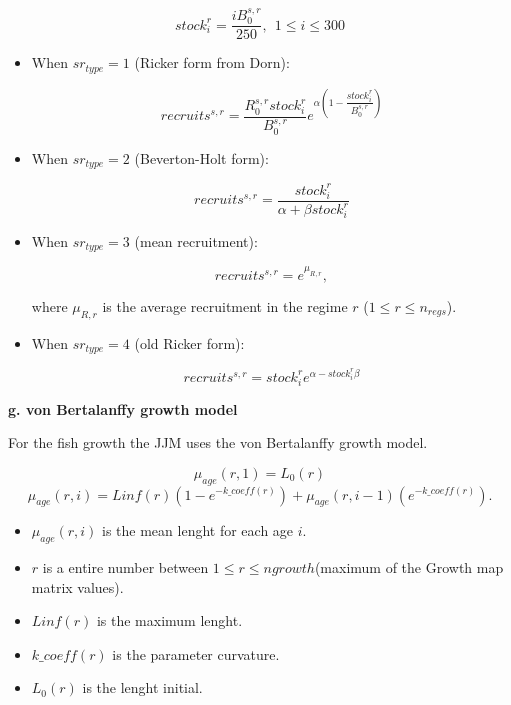 \documentclass{article}
\begin{document}
\begin{equation}
stock^r_i=\dfrac{iB^{s,r}_0}{250}, \ \ 1\leq i \leq 300
\end{equation}

\begin{itemize}

\item When $sr_{type}=1$ (Ricker form from Dorn):

    \begin{equation}
    recruits^{s,r} = \dfrac{R^{s,r}_0 stock^r_i}{B^{s,r}_0}e^{\alpha \left(1-\dfrac{stock^r_i}{B^{s,r}_0}\right)}
    \end{equation}

\item When $sr_{type}=2$ (Beverton-Holt form):

    \begin{equation}
    recruits^{s,r} = \dfrac{stock^r_i}{\alpha+\beta stock^r_i}
    \end{equation}

\item When $sr_{type}=3$ (mean recruitment):

    \begin{equation}
    recruits^{s,r} = e^{\mu_{R,r}},
    \end{equation}

    where $\mu_{R,r}$ is the average recruitment in the regime $r$ ($1\leq r \leq n_{regs}$).

\item When $sr_{type}=4$ (old Ricker form):

    \begin{equation}
    recruits^{s,r} =  stock^r_i e^{\alpha-stock^r_i \beta}
    \end{equation}

\end{itemize}


\hfill

\textbf{g. von Bertalanffy growth model}

For the fish growth the JJM uses the von Bertalanffy growth model.

\begin{equation}
    \mu_{age}(r,1)=L_0(r)
\end{equation}
\begin{equation}
    \mu_{age}(r,i)=Linf(r)(1-e^{-{k\_coeff(r)}})+\mu_{age}(r,i-1)(e^{-k\_{coeff(r)}}).
\end{equation}
 \begin{itemize}
    \item $\mu_{age}(r,i)$ is the mean lenght for each age $i$.
     \item $r$ is a entire number between $1\leq r \leq ngrowth$(maximum of the Growth map matrix values). 
     \item $Linf(r)$ is the maximum lenght.
     \item $k\_coeff(r)$ is the parameter curvature.
     \item $L_0(r)$ is the lenght initial.
     
 \end{itemize}
\end{document}
